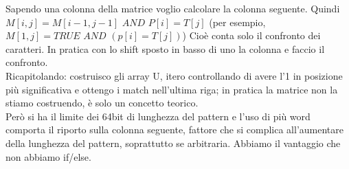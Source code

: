 \documentclass[a4paper,12pt, oneside]{book}
\begin{document}
Sapendo una colonna della matrice voglio calcolare la colonna
seguente. Quindi $M[i,j]=M[i-1,j-1]\,\,AND\,\,P[i]=T[j]$ (per
esempio, $M[1,j]=TRUE\,\,AND\,\,(p[i]=T[j])$) Cioè conta solo il
confronto dei caratteri. In pratica con lo shift sposto in
basso di uno la colonna e faccio il confronto. \\
Ricapitolando: costruisco gli array U, itero controllando di
avere l'1 in posizione più significativa e ottengo i match nell'ultima
riga; in pratica la matrice non la stiamo costruendo, è solo un
concetto teorico.\\ Però si ha il limite dei 64bit di lunghezza del
pattern e l'uso di più word comporta il riporto sulla colonna
seguente, fattore che si complica all'aumentare della lunghezza del
pattern, soprattutto se arbitraria. Abbiamo il vantaggio
che non abbiamo if/else. 
\end{document}
